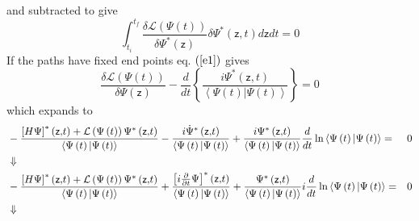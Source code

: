 \documentclass[aps,preprint]{revtex4}
\begin{document}
and subtracted to give 
\begin{equation}
\int_{t_{i}}^{t_{f}}\frac{\delta \mathcal{L}\left( \Psi \left( t\right)
\right) }{\delta \Psi ^{\ast }\left( \mathsf{z}\right) }\delta \Psi ^{\ast
}\left( \mathsf{z,}t\right) d\mathsf{z}dt=0  \label{e2}
\end{equation}%
If the paths have fixed end points eq. $\left( \ref{e1}\right) $ gives 
\begin{equation}
\frac{\delta \mathcal{L}\left( \Psi \left( t\right) \right) }{\delta \Psi
\left( \mathsf{z}\right) }-\frac{d}{dt}\left\{ \frac{i\Psi ^{\ast }\left( 
\mathsf{z,}t\right) }{\left\langle \Psi \left( t\right) |\Psi \left(
t\right) \right\rangle }\right\} =0
\end{equation}%
which expands to 
\begin{eqnarray*}
&-\frac{\left[ H\Psi \right] ^{\ast }\left( \mathsf{z,}t\right) +\mathcal{L}%
\left( \Psi \left( t\right) \right) \Psi ^{\ast }\left( \mathsf{z,}t\right) 
}{\left\langle \Psi \left( t\right) |\Psi \left( t\right) \right\rangle }-%
\frac{i\dot{\Psi}^{\ast }\left( \mathsf{z,}t\right) }{\left\langle \Psi
\left( t\right) |\Psi \left( t\right) \right\rangle }+\frac{i\Psi ^{\ast
}\left( \mathsf{z,}t\right) }{\left\langle \Psi \left( t\right) |\Psi \left(
t\right) \right\rangle }\frac{d}{dt}\ln \left\langle \Psi \left( t\right)
|\Psi \left( t\right) \right\rangle =&0 \\
&\Downarrow & \\
&-\frac{\left[ H\Psi \right] ^{\ast }\left( \mathsf{z,}t\right) +\mathcal{L}%
\left( \Psi \left( t\right) \right) \Psi ^{\ast }\left( \mathsf{z,}t\right) 
}{\left\langle \Psi \left( t\right) |\Psi \left( t\right) \right\rangle }+%
\frac{\left[ i\frac{\partial }{\partial t}\Psi \right] ^{\ast }\left( 
\mathsf{z,}t\right) }{\left\langle \Psi \left( t\right) |\Psi \left(
t\right) \right\rangle }+\frac{\Psi ^{\ast }\left( \mathsf{z,}t\right) }{%
\left\langle \Psi \left( t\right) |\Psi \left( t\right) \right\rangle }i%
\frac{d}{dt}\ln \left\langle \Psi \left( t\right) |\Psi \left( t\right)
\right\rangle =&0 \\
&\Downarrow &
\end{eqnarray*}
\end{document}
